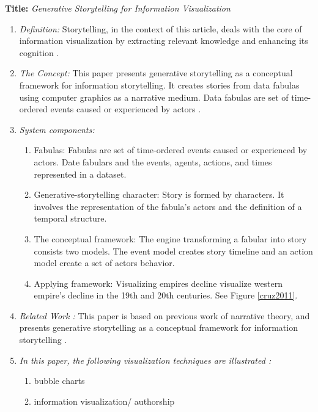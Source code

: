 \documentclass{egpubl}
\begin{document}
\textbf{Title:} \textit{Generative Storytelling for Information Visualization}
\begin{enumerate}
\item \textit{Definition:} Storytelling, in the context of this article, deals with the core of information visualization by extracting relevant knowledge and enhancing its cognition \cite{cruz2011}.
\item \textit{The Concept:} This paper presents generative storytelling as a conceptual framework for information storytelling. It creates stories from data fabulas using computer graphics as a narrative medium. Data fabulas are set of time-ordered events caused or experienced by actors \cite{cruz2011}. 

\item  \textit{System components:} 
\begin{enumerate}
\item Fabulas: Fabulas are set of time-ordered events caused or experienced by actors. Date fabulars and the events, agents, actions, and times represented in a dataset.
\item Generative-storytelling character: Story is formed by characters. It involves the representation of the fabula's actors and the definition of a temporal structure.
\item The conceptual framework: The engine transforming a fabular into story consists two models. The event model creates story timeline and an action model create a set of actors behavior.
\item Applying framework: Visualizing empires decline visualize western empire's decline in the 19th and 20th centuries. See Figure \ref{cruz2011}.
\end{enumerate}
\item \textit{Related Work :} This paper is based on  previous work of narrative theory\cite{naratology1985}, and presents generative storytelling as a conceptual framework for information storytelling \cite{cruz2011}.
\item \textit{In this paper, the following visualization techniques are illustrated :} 
\begin{enumerate}
\item bubble charts
\item information visualization/ authorship
\end{enumerate}
\end{enumerate}
\end{document}
